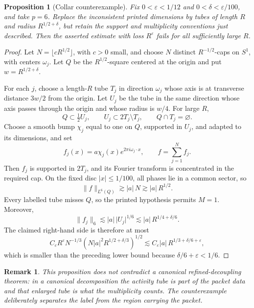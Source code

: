 \documentclass[11pt,letterpaper]{amsart}
\newtheorem{proposition}[proposition]{Proposition}
\newtheorem{remark}[remark]{Remark}
\newcommand{\eps}{\varepsilon}
\newcommand{\abs}[1]{\lvert#1\rvert}
\newcommand{\norm}[1]{\lVert#1\rVert}
\begin{document}
\begin{proposition}[Collar counterexample]
\label{prop:intended-counterexample}
Fix \(0<\eps<1/12\) and \(0<\delta<\eps/100\), and take \(p=6\).
Replace the inconsistent printed dimensions by tubes of length \(R\) and
radius \(R^{1/2+\delta}\), but retain the support and multiplicity
conventions just described.  Then the asserted estimate with loss \(R^\eps\)
fails for all sufficiently large \(R\).
\end{proposition}

\begin{proof}
Let \(N=\lfloor cR^{1/2}\rfloor\), with \(c>0\) small, and choose \(N\)
distinct \(R^{-1/2}\)-caps on \(S^1\), with centers \(\omega_j\).  Let \(Q\)
be the \(R^{1/2}\)-square centered at the origin and put
\(w=R^{1/2+\delta}\).

For each \(j\), choose a length-\(R\) tube \(T_j\) in direction \(\omega_j\)
whose axis is at transverse distance \(3w/2\) from the origin.  Let \(U_j\)
be the tube in the same direction whose axis passes through the origin and
whose radius is \(w/4\).  For large \(R\),
\[
 Q\subset\tfrac12U_j,\qquad
 U_j\subset2T_j\setminus T_j,\qquad
 Q\cap T_j=\varnothing.
\]
Choose a smooth bump \(\chi_j\) equal to one on \(Q\), supported in \(U_j\),
and adapted to its dimensions, and set
\[
 f_j(x)=a\chi_j(x)e^{2\pi i\omega_j\cdot x},\qquad
 f=\sum_{j=1}^N f_j.
\]
Then \(f_j\) is supported in \(2T_j\), and its Fourier transform is
concentrated in the required cap.  On the fixed disc
\(\abs{x}\le1/100\), all phases lie in a common sector, so
\[
 \norm{f}_{L^6(Q)}\gtrsim \abs{a}\,N
 \gtrsim\abs{a}\,R^{1/2}.
\]
Every labelled tube misses \(Q\), so the printed hypothesis permits \(M=1\).
Moreover,
\[
 \norm{f_j}_6\lesssim\abs{a}\,\abs{U_j}^{1/6}
 \lesssim\abs{a}\,R^{1/4+\delta/6}.
\]
The claimed right-hand side is therefore at most
\[
 C_\eps R^\eps N^{-1/3}
 \left(N\abs{a}^2R^{1/2+\delta/3}\right)^{1/2}
 \lesssim C_\eps\abs{a}\,R^{1/3+\delta/6+\eps},
\]
which is smaller than the preceding lower bound because
\(\delta/6+\eps<1/6\).
\end{proof}

\begin{remark}
This proposition does not contradict a canonical refined-decoupling theorem:
in a canonical decomposition the activity tube is part of the packet data and
that enlarged tube is what the multiplicity counts.  The counterexample
deliberately separates the label from the region carrying the packet.
\end{remark}
\end{document}
